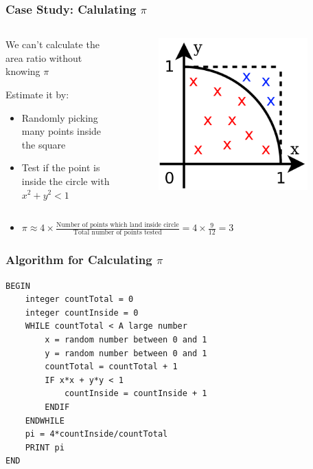 \documentclass[14pt]{beamer}
\begin{document}
\begin{frame}
\frametitle{Case Study: Calulating $\pi$}
\begin{columns}
\begin{column}{0.6\textwidth}
\begin{itemize}
\small{
\item We can't calculate the area ratio without knowing $\pi$
\item Estimate it by:
\begin{itemize}
	\item Randomly picking many points inside the square
	\item Test if the point is inside the circle with $x^2 + y^2 < 1$
	\end{itemize}
}
\end{itemize}
\end{column}
\begin{column}{0.4\textwidth}
\begin{figure}
\includegraphics[width=0.9\textwidth]{pi-dots.png}
\end{figure}
\end{column}
\end{columns}
\begin{itemize}
\item $\pi \approx 4 \times \frac{\textrm{Number of points which land inside circle}}{\textrm{Total number of points tested}} = 4 \times \frac{9}{12} = 3$
\end{itemize}
\end{frame}

\begin{frame}[fragile]
\frametitle{Algorithm for Calculating $\pi$}
\begin{lstlisting}[style=pseudo]
BEGIN
	integer countTotal = 0
	integer countInside = 0
	WHILE countTotal < A large number
		x = random number between 0 and 1
		y = random number between 0 and 1
		countTotal = countTotal + 1
		IF x*x + y*y < 1
			countInside = countInside + 1
		ENDIF
	ENDWHILE
	pi = 4*countInside/countTotal
	PRINT pi
END
\end{lstlisting}
\end{frame}
\end{document}

